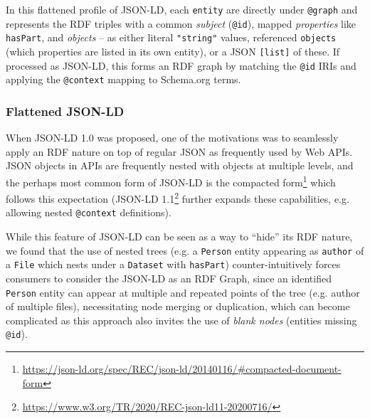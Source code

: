 \documentclass[ds,v1.1.2,openaccess]{iosart2x}%
\begin{document}
In this flattened profile of JSON-LD, each \texttt{{entity}} are directly
under \texttt{@graph} and represents the RDF triples with a common \textit{subject}
(\texttt{@id}), mapped \textit{properties} like \texttt{hasPart}, and \textit{objects} -- as
either literal \texttt{"string"} values, referenced \texttt{{objects}} (which
properties are listed in its own entity), or a JSON \texttt{[list]} of these.
If processed as JSON-LD, this forms an RDF graph by matching the \texttt{@id}
IRIs and applying the \texttt{@context} mapping to Schema.org terms.
\normalsize

 \subsubsection{Flattened JSON-LD}

When JSON-LD 1.0 \cite{sporny_2014} was proposed, one of the motivations
was to seamlessly apply an RDF nature on top of regular JSON as
frequently used by Web APIs. JSON objects in APIs are frequently nested
with objects at multiple levels, and the perhaps most common form of
JSON-LD is the compacted
form\footnote{\url{https://json-ld.org/spec/REC/json-ld/20140116/\#compacted-document-form}}
which follows this expectation (JSON-LD
1.1\footnote{\url{https://www.w3.org/TR/2020/REC-json-ld11-20200716/}} further
expands these capabilities, e.g. allowing nested \texttt{@context} definitions).

While this feature of JSON-LD can be seen as a way to ``hide'' its RDF
nature, we found that the use of nested trees (e.g. a \texttt{Person} entity
appearing as \texttt{author} of a \texttt{File} which nests under a \texttt{Dataset} with
\texttt{hasPart}) counter-intuitively forces consumers to consider the JSON-LD
as an RDF Graph, since an identified \texttt{Person} entity can appear at
multiple and repeated points of the tree (e.g. author of multiple
files), necessitating node merging or duplication, which can become
complicated as this approach also invites the use of \textit{blank nodes}
(entities missing \texttt{@id}).
\end{document}
